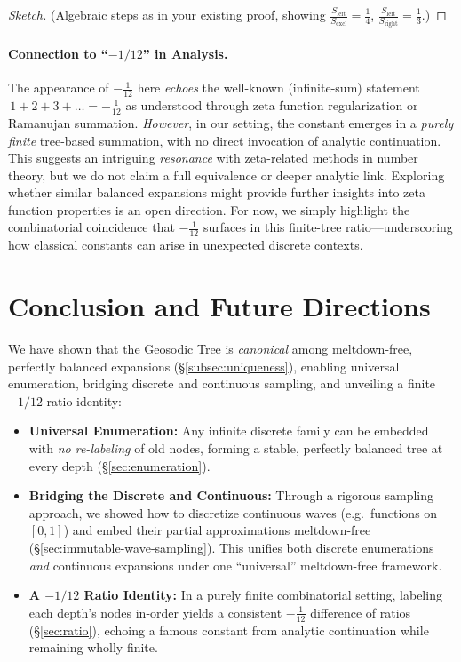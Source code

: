 \documentclass[11pt]{article}
\theoremstyle{definition}
\theoremstyle{remark}
\begin{document}
\begin{proof}[Sketch]
(Algebraic steps as in your existing proof, showing 
\(\tfrac{S_{\text{left}}}{S_{\text{excl}}} = \frac{1}{4}\),
\(\tfrac{S_{\text{left}}}{S_{\text{right}}} = \frac{1}{3}\).)
\end{proof}

\paragraph{Connection to ``\texorpdfstring{$-1/12$}{-1/12}'' in Analysis.}
The appearance of $-\tfrac{1}{12}$ here \emph{echoes} the well-known 
(infinite-sum) statement $\,1 + 2 + 3 + \dots = -\tfrac{1}{12}$ 
as understood through zeta function regularization or Ramanujan summation. 
\emph{However}, in our setting, the constant emerges in a \emph{purely finite} 
tree-based summation, with no direct invocation of analytic continuation. 
This suggests an intriguing \emph{resonance} with zeta-related methods 
in number theory, but we do not claim a full equivalence or deeper analytic link. 
Exploring whether similar balanced expansions might provide further insights 
into zeta function properties is an open direction. For now, we simply highlight 
the combinatorial coincidence that $-\tfrac{1}{12}$ surfaces in this 
finite-tree ratio---underscoring how classical constants can arise 
in unexpected discrete contexts.
 \section{Conclusion and Future Directions}
\label{sec:conclusion}

We have shown that the Geosodic Tree is \emph{canonical} among meltdown-free,
perfectly balanced expansions (\S\ref{subsec:uniqueness}), enabling universal
enumeration, bridging discrete and continuous sampling, and unveiling a finite
$-1/12$ ratio identity:

\begin{itemize}
  \item \textbf{Universal Enumeration:}
    Any infinite discrete family can be embedded with \emph{no re-labeling} of old nodes,
    forming a stable, perfectly balanced tree at every depth (\S\ref{sec:enumeration}).

  \item \textbf{Bridging the Discrete and Continuous:}
    Through a rigorous sampling approach, we showed how to discretize continuous waves
    (e.g.\ functions on $[0,1]$) and embed their partial approximations meltdown-free
    (\S\ref{sec:immutable-wave-sampling}). This unifies both discrete enumerations
    \emph{and} continuous expansions under one “universal” meltdown-free framework.

  \item \textbf{A $-1/12$ Ratio Identity:}
    In a purely finite combinatorial setting, labeling each depth’s nodes
    in-order yields a consistent $-\tfrac{1}{12}$ difference of ratios
    (\S\ref{sec:ratio}), echoing a famous constant from analytic continuation
    while remaining wholly finite.
\end{itemize}
\end{document}
